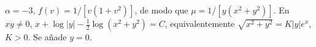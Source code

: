 $\alpha=-3$, $f(v)=1/[v(1+v^2)]$, de modo que $\mu=1/[y(x^2+y^2)]$. En $xy\ne0$, $x+\log|y|-\tfrac12\log(x^2+y^2)=C$, equivalentemente $\sqrt{x^2+y^2}=K|y|e^x$, $K>0$. Se añade $y=0$.
